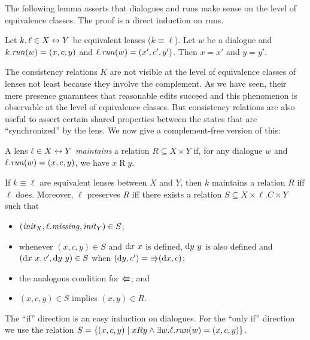 \iffull
\iflater
{}The
following lemma asserts that dialogues and runs make sense on the level of
equivalence classes. The proof is a direct induction on runs.
\begin{lemma}
Let $k,\ell \in X\leftrightarrow Y$ be equivalent lenses ($k\equiv \ell$). Let $w$
be a dialogue and $k.\mathit{run}(w)=(x,c,y)$ and
$\ell.\mathit{run}(w)=(x',c',y')$. Then $x=x'$ and $y=y'$. 
\end{lemma}

The consistency relations $K$ are not visible at the level
of equivalence classes of lenses not least because they involve the
complement. As we have seen, their mere presence guarantees that reasonable
edits succeed and this phenomenon is observable at the level of equivalence
classes. But consistency relations are also useful to assert certain shared
properties between the states that are ``synchronized'' by the lens. We now
give a complement-free version of this:

\begin{defn}
A lens $\ell \in X\leftrightarrow Y$ {\em maintains} a relation $R\subseteq X\times Y$ if,
for any dialogue $w$ and $\ell.\mathit{run}(w)=(x,c,y)$, we have $x\mathrel{R}y$. 
\end{defn}

\begin{theorem}
If $k\equiv\ell$ are equivalent lenses between $X$ and $Y$, then $k$
maintains a relation $R$ iff $\ell$ does.
%
Moreover, $\ell$ preserves $R$ iff there exists a relation $S\subseteq
X\times\ell.C\times Y$ such that 
\begin{itemize}
\item $(\mathit{init}_X,\ell.\mathit{missing},\mathit{init}_Y)\in S$;
\item whenever $(x,c,y)\in S$ and
$\textrm{d} x\ x$ is defined, $\textrm{d} y\ y$ is also defined and $(\textrm{d} x\ x,c',\textrm{d} y\
y)\in S$ when $(\textrm{d} y,c')=\mathord{\Rrightarrow}(\textrm{d} x,c)$; 
\item the analogous condition for $\mathord{\Lleftarrow}$; and
\item $(x,c,y)\in S$ implies $(x,y)\in R$.
\end{itemize}
\end{theorem}

\iffull
\begin{pf}
The ``if'' direction is an easy induction on dialogues. For the ``only
if'' direction we use the relation $S=\{(x,c,y)\mid xRy\wedge \exists
w.\ell.\mathit{run}(w)=(x,c,y)\}$. 
\end{pf}
\fi
\fi
\fi

